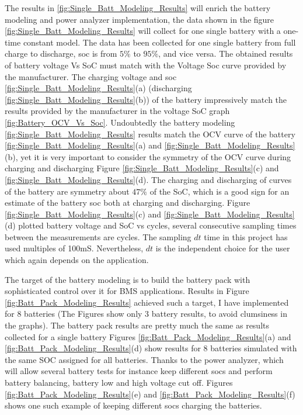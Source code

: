 The results in \ref{fig:Single_Batt_Modeling_Results} will enrich the battery modeling and power analyzer implementation, the data shown in the figure  \ref{fig:Single_Batt_Modeling_Results} will collect for one single battery with a one-time constant model. The data has been collected for one single battery from full charge to discharge, soc is from $5\%$ to $95\%$, and vice versa. The obtained results of battery voltage Vs SoC must match with the Voltage Soc curve provided by the manufacturer.
The charging voltage and soc \ref{fig:Single_Batt_Modeling_Results}(a) (discharging \ref{fig:Single_Batt_Modeling_Results}(b)) of the battery impressively match the results provided by the manufacturer in the voltage SoC graph \ref{fig:Battery_OCV_Vs_Soc}. 
Undoubtedly the battery modeling \ref{fig:Single_Batt_Modeling_Results} results match the OCV curve of the battery \ref{fig:Single_Batt_Modeling_Results}(a) and \ref{fig:Single_Batt_Modeling_Results}(b), yet it is very important to consider the symmetry of the OCV curve during charging and discharging Figure \ref{fig:Single_Batt_Modeling_Results}(c) and \ref{fig:Single_Batt_Modeling_Results}(d). The charging and discharging of curves of the battery are symmetry about $47\%$ of the SoC, which is a good sign for an estimate of the battery soc both at charging and discharging.
Figure \ref{fig:Single_Batt_Modeling_Results}(c) and \ref{fig:Single_Batt_Modeling_Results}(d)  plotted battery voltage and SoC vs cycles, several consecutive sampling times between the measurements are cycles. The sampling $dt$ time in this project has used multiples of 100mS. Nevertheless, $dt$ is the independent choice for the user which again depends on the application.

The target of the battery modeling is to build the battery pack with sophisticated control over it for BMS applications. Results in Figure \ref{fig:Batt_Pack_Modeling_Results} achieved such a target, I have implemented for 8 batteries (The Figures show only 3 battery results, to avoid clumsiness in the graphs).
The battery pack results are pretty much the same as results collected for a single battery Figures \ref{fig:Batt_Pack_Modeling_Results}(a) and \ref{fig:Batt_Pack_Modeling_Results}(d) show results for 8 batteries simulated with the same SOC assigned for all batteries. Thanks to the power analyzer, which will allow several battery tests for instance keep different socs and perform battery balancing, battery low and high voltage cut off. Figures \ref{fig:Batt_Pack_Modeling_Results}(e) and \ref{fig:Batt_Pack_Modeling_Results}(f) shows one such example of keeping different socs charging the batteries.